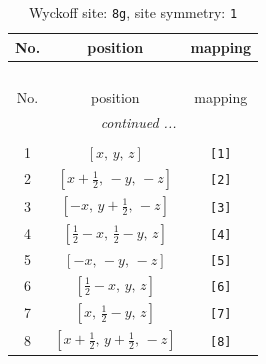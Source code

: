\documentclass[fleqn,8pt]{jsarticle}
\begin{document}
\renewcommand{\arraystretch}{1.2}
\begin{longtable}{ccc}
\caption{Wyckoff site: {\tt 8g}, site symmetry: {\tt 1}}
 \\
 \hline \hline
No. & position & mapping \\ \hline \endfirsthead

\multicolumn{2}{l}{\tablename\ \thetable{}} \\
 \hline \hline
No. & position & mapping \\ \hline \endhead

 \hline \hline
\multicolumn{2}{r}{\footnotesize\it continued ...} \\ \endfoot

 \hline \hline
\multicolumn{2}{r}{} \\ \endlastfoot

1 & $\left[ x,\, y,\, z \right]$ & {\tt [1]} \\ \hline
2 & $\left[ x + \frac{1}{2},\, - y,\, - z \right]$ & {\tt [2]} \\ \hline
3 & $\left[ - x,\, y + \frac{1}{2},\, - z \right]$ & {\tt [3]} \\ \hline
4 & $\left[ \frac{1}{2} - x,\, \frac{1}{2} - y,\, z \right]$ & {\tt [4]} \\ \hline
5 & $\left[ - x,\, - y,\, - z \right]$ & {\tt [5]} \\ \hline
6 & $\left[ \frac{1}{2} - x,\, y,\, z \right]$ & {\tt [6]} \\ \hline
7 & $\left[ x,\, \frac{1}{2} - y,\, z \right]$ & {\tt [7]} \\ \hline
8 & $\left[ x + \frac{1}{2},\, y + \frac{1}{2},\, - z \right]$ & {\tt [8]} \\
\end{longtable}
\end{document}
